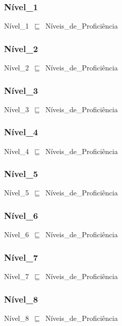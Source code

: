 \documentclass{article}
\begin{document}
\subsubsection*{Nível\_1}

Nível\_1~\ensuremath{\sqsubseteq}~Níveis\_de\_Proficiência~

\subsubsection*{Nível\_2}

Nível\_2~\ensuremath{\sqsubseteq}~Níveis\_de\_Proficiência~

\subsubsection*{Nível\_3}

Nível\_3~\ensuremath{\sqsubseteq}~Níveis\_de\_Proficiência~

\subsubsection*{Nível\_4}

Nível\_4~\ensuremath{\sqsubseteq}~Níveis\_de\_Proficiência~

\subsubsection*{Nível\_5}

Nível\_5~\ensuremath{\sqsubseteq}~Níveis\_de\_Proficiência~

\subsubsection*{Nível\_6}

Nível\_6~\ensuremath{\sqsubseteq}~Níveis\_de\_Proficiência~

\subsubsection*{Nível\_7}

Nível\_7~\ensuremath{\sqsubseteq}~Níveis\_de\_Proficiência~

\subsubsection*{Nível\_8}

Nível\_8~\ensuremath{\sqsubseteq}~Níveis\_de\_Proficiência~
\end{document}
